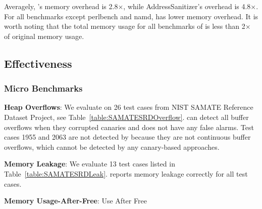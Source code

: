 Averagely, \doubletake{}'s memory overhead is 2.8$\times$, while AddressSanitizer's overhead is 4.8$\times$. For all benchmarks except perlbench and namd, \doubletake{} has lower memory overhead. It is worth noting that the total memory usage for all benchmarks of \doubletake{} is less than 2$\times$ of original memory usage. 
 
\subsection{Effectiveness}
\label{sec:effect}

\subsubsection{Micro Benchmarks}
{\bf Heap Overflows}: We evaluate \doubletake{} on 26 test cases from NIST SAMATE Reference Dataset Project, see Table~\ref{table:SAMATESRDOverflow}. \doubletake{} can detect all buffer overflows when they corrupted canaries and does not have any false alarms. Test cases 1955 and 2063 are not detected by \doubletake{} because they are not continuous buffer overflows, which cannot be detected by any canary-based approaches.

{\bf Memory Leakage}: We evaluate 13 test cases listed in Table~\ref{table:SAMATESRDLeak}. \doubletake{} reports memory leakage correctly for all test cases.  

{\bf Memory Usage-After-Free}: 
{Use After Free}
  

